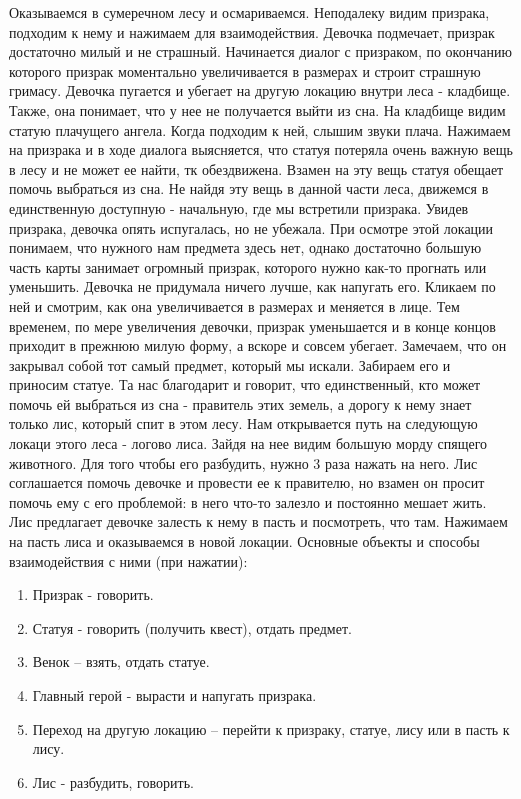 Оказываемся в сумеречном лесу и осмариваемся. Неподалеку видим призрака, подходим к нему и нажимаем для взаимодействия. Девочка подмечает, призрак достаточно милый и не страшный. Начинается диалог с призраком, по окончанию которого призрак моментально увеличивается в размерах и строит страшную гримасу. Девочка пугается и убегает на другую локацию внутри леса - кладбище. Также, она понимает, что у нее не получается выйти из сна. На кладбище видим статую плачущего ангела. Когда подходим к ней, слышим звуки плача. Нажимаем на призрака и в ходе диалога выясняется, что статуя потеряла очень важную вещь в лесу и не может ее найти, тк обездвижена. Взамен на эту вещь статуя обещает помочь выбраться из сна. Не найдя эту вещь в данной части леса, движемся в единственную доступную - начальную, где мы встретили призрака. Увидев призрака, девочка опять испугалась, но не убежала. При осмотре этой локации понимаем, что нужного нам предмета здесь нет, однако достаточно большую часть карты занимает огромный призрак, которого нужно как-то прогнать или уменьшить. Девочка не придумала ничего лучше, как напугать его. Кликаем по ней и смотрим, как она увеличивается в размерах и меняется в лице. Тем временем, по мере увеличения девочки, призрак уменьшается и в конце концов приходит в прежнюю милую форму, а вскоре и совсем убегает. Замечаем, что он закрывал собой тот самый предмет, который мы искали. Забираем его и приносим статуе. Та нас благодарит и говорит, что единственный, кто может помочь ей выбраться из сна - правитель этих земель, а дорогу к нему знает только лис, который спит в этом лесу. Нам открывается путь на следующую локаци этого леса - логово лиса. Зайдя на нее видим большую морду спящего животного. Для того чтобы его разбудить, нужно 3 раза нажать на него. Лис соглашается помочь девочке и провести ее к правителю, но взамен он просит помочь ему с его проблемой: в него что-то залезло и постоянно мешает жить. Лис предлагает девочке залесть к нему в пасть и посмотреть, что там. Нажимаем на пасть лиса и оказываемся в новой локации. Основные объекты и способы  взаимодействия с ними (при нажатии):
\begin{enumerate}
	\item Призрак - говорить.
	\item Статуя - говорить (получить квест), отдать предмет.
	\item Венок – взять, отдать статуе.
	\item Главный герой - вырасти и напугать призрака.
	\item Переход на другую локацию – перейти к призраку, статуе, лису или в пасть к лису.
	\item Лис - разбудить, говорить.
\end{enumerate}

